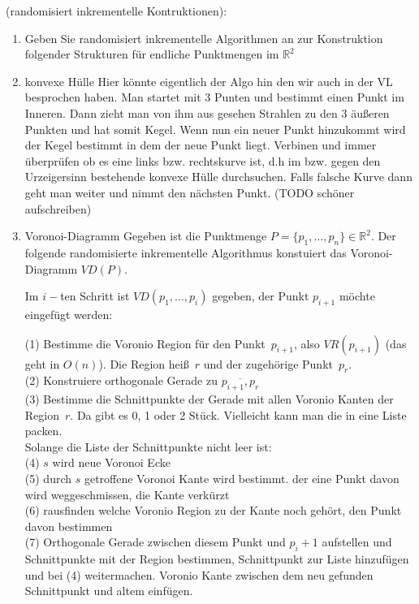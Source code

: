 \documentclass[a4paper, titlepage=false, parskip=full-, 10pt]{scrartcl}
\newcounter{tasknbr}
\newenvironment{task}[1]{{\bf Aufgabe \arabic {tasknbr}\stepcounter{tasknbr}} (#1):\begin{enumerate}}{\end{enumerate}}
\newcommand{\subtask}[1]{\item[#1)]}
\begin{document}
\begin{task}{randomisiert inkrementelle Kontruktionen}
\item[]
Geben Sie randomisiert inkrementelle Algorithmen an zur Konstruktion folgender Strukturen für endliche Punktmengen im $\mathbb{R}^2$

\subtask{a} konvexe Hülle
Hier könnte eigentlich der Algo hin den wir auch in der VL besprochen haben. Man startet mit 3 Punten und bestimmt einen Punkt im Inneren. Dann zieht man von ihm aus gesehen Strahlen zu den 3 äußeren Punkten und hat somit Kegel. Wenn nun ein neuer Punkt hinzukommt wird der Kegel bestimmt in dem der neue Punkt liegt. Verbinen und immer überprüfen ob es eine links bzw. rechtskurve ist, d.h im bzw. gegen den Urzeigersinn bestehende konvexe Hülle durchsuchen. Falls falsche Kurve dann geht man weiter und nimmt den nächsten Punkt. (TODO schöner aufschreiben)

\subtask{b} Voronoi-Diagramm
Gegeben ist die Punktmenge $P=\{p_1, \dots, p_n\} \in \mathbb{R}^2$. Der folgende randomisierte inkrementelle Algorithmus konstuiert das Voronoi-Diagramm $VD(P)$.

Im $i-$ten Schritt ist $VD(p_1, \dots, p_i)$ gegeben, der Punkt $p_{i+1}$ möchte eingefügt werden:

(1) Bestimme die Voronio Region für den Punkt~$p_{i+1}$, also $VR(p_{i+1})$ (das geht in $O(n)$). Die Region heiß~$r$ und der zugehörige Punkt~$p_r$.\\


(2) Konstruiere orthogonale Gerade zu $\overline{p_{i+1}, p_r}$ \\

(3) Bestimme die Schnittpunkte der Gerade mit allen Voronio Kanten der Region~$r$. Da gibt es 0, 1 oder 2 Stück. Vielleicht kann man die in eine Liste packen.\\

Solange die Liste der Schnittpunkte nicht leer ist:\\


(4) $s$ wird neue Voronoi Ecke\\

(5) durch $s$ getroffene Voronoi Kante wird bestimmt. der eine Punkt davon wird weggeschmissen, die Kante verkürzt\\
(6) rausfinden welche Voronio Region zu der Kante noch gehört, den Punkt davon bestimmen\\
(7) Orthogonale Gerade zwischen diesem Punkt und $p_i+1$ aufstellen und Schnittpunkte mit der Region bestimmen, Schnittpunkt zur Liste hinzufügen und bei (4) weitermachen. Voronio Kante zwischen dem neu gefunden Schnittpunkt und altem einfügen.


\end{task}
\end{document}
